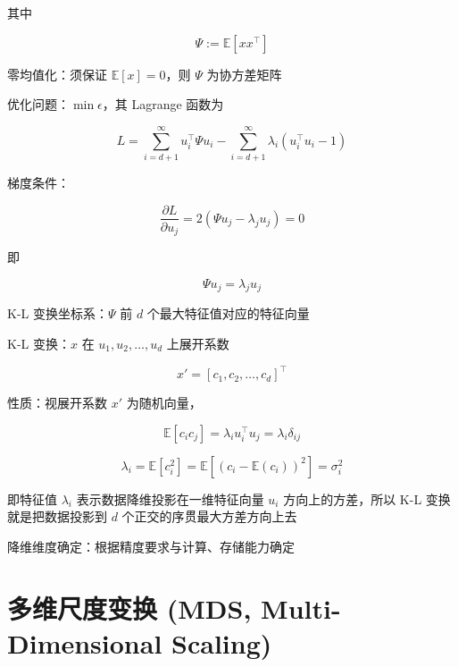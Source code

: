 \documentclass[openany,a4paper,12pt]{ctexbook}
\theoremstyle{kaiti}
\theoremstyle{normal}
\begin{document}
其中

\begin{equation}
\Psi :=\mathbb{E} \left[xx^{\top} \right]
\end{equation}

零均值化：须保证 $\mathbb{E} \left[x \right] =0$，则 $\Psi$ 为协方差矩阵

优化问题：$\min \epsilon$，其 Lagrange 函数为

\begin{equation}
L=\sum_{i=d+1}^{\infty}u_{i}^{\top}\Psi u_i-\sum_{i=d+1}^{\infty}\lambda_i\left(u_{i}^{\top}u_i-1 \right)
\end{equation}

梯度条件：

\begin{equation}
\frac{\partial L}{\partial u_j}=2\left(\Psi u_j-\lambda_ju_j \right)=0
\end{equation}

即

\begin{equation}
\Psi u_j=\lambda_ju_j
\end{equation}

K-L 变换坐标系：$\Psi$ 前 $d$ 个最大特征值对应的特征向量

K-L 变换：$x$ 在 $u_1,u_2,\dots ,u_d$ 上展开系数

\begin{equation}
x'=\left[c_1,c_2,\dots ,c_d \right] ^{\top}
\end{equation}

性质：视展开系数 $x'$ 为随机向量，

\begin{equation}
\mathbb{E} \left[c_ic_j \right] =\lambda_iu_{i}^{\top}u_j=\lambda_i\delta_{ij}
\end{equation}

\begin{equation}
\lambda_i=\mathbb{E} \left[c_{i}^{2} \right] =\mathbb{E} \left[\left(c_i-\mathbb{E} \left(c_i \right)\right)^2 \right] =\sigma_{i}^{2}
\end{equation}

即特征值 $\lambda_i$ 表示数据降维投影在一维特征向量 $u_i$ 方向上的方差，所以 K-L 变换就是把数据投影到 $d$ 个正交的序贯最大方差方向上去

降维维度确定：根据精度要求与计算、存储能力确定

\section{多维尺度变换 (MDS, Multi-Dimensional Scaling) }
\end{document}
